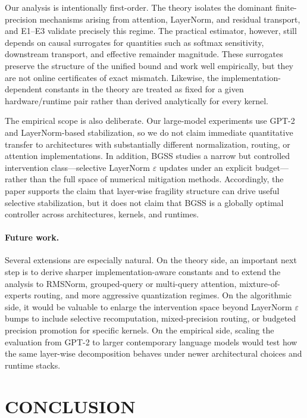 \documentclass[twoside]{article}
\theoremstyle{definition}
\theoremstyle{remark}
\begin{document}
Our analysis is intentionally first-order. The theory isolates the dominant
finite-precision mechanisms arising from attention, LayerNorm, and residual
transport, and E1--E3 validate precisely this regime. The practical estimator,
however, still depends on causal surrogates for quantities such as softmax
sensitivity, downstream transport, and effective remainder magnitude. These
surrogates preserve the structure of the unified bound and work well
empirically, but they are not online certificates of exact mismatch. Likewise,
the implementation-dependent constants in the theory are treated as fixed for a
given hardware/runtime pair rather than derived analytically for every kernel.

The empirical scope is also deliberate. Our large-model experiments use GPT-2
and LayerNorm-based stabilization, so we do not claim immediate quantitative
transfer to architectures with substantially different normalization, routing,
or attention implementations. In addition, BGSS studies a narrow but controlled
intervention class---selective LayerNorm $\varepsilon$ updates under an
explicit budget---rather than the full space of numerical mitigation methods.
Accordingly, the paper supports the claim that layer-wise fragility structure
can drive useful selective stabilization, but it does not claim that BGSS is a
globally optimal controller across architectures, kernels, and runtimes.

\paragraph{Future work.}
Several extensions are especially natural. On the theory side, an important
next step is to derive sharper implementation-aware constants and to extend the
analysis to RMSNorm, grouped-query or multi-query attention, mixture-of-experts
routing, and more aggressive quantization regimes. On the algorithmic side, it
would be valuable to enlarge the intervention space beyond LayerNorm
$\varepsilon$ bumps to include selective recomputation, mixed-precision
routing, or budgeted precision promotion for specific kernels. On the empirical
side, scaling the evaluation from GPT-2 to larger contemporary language models
would test how the same layer-wise decomposition behaves under newer
architectural choices and runtime stacks.


\section{CONCLUSION}
\label{sec:conclusion}
\end{document}
